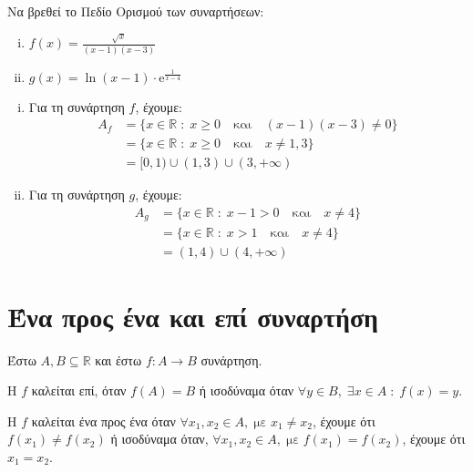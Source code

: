 \begin{exercise}
  Να βρεθεί το Πεδίο Ορισμού των συναρτήσεων:
  \begin{enumerate}[i)]
    \item $ f(x) = \frac{\sqrt{x}}{(x-1)(x-3)} $
    \item $ g(x) = \ln{(x-1)} \cdot \mathrm{e}^{\frac{1}{x-4}} $
  \end{enumerate}
\end{exercise}
\begin{solution}
\item {}
  \begin{enumerate}[i)]
    \item Για τη συνάρτηση $f$, έχουμε:
      \begin{align*}
        A_{f} &= \{ x \in \mathbb{R} \; : \; x \geq 0 \quad \text{και} \quad (x-1)(x-3)
        \neq 0 \} \\ 
              &= \{ x \in \mathbb{R} \; : \; x \geq 0 \quad
              \text{και} \quad x \neq 1,3 \} \\ 
              &= [0,1) \cup (1,3) \cup (3, + \infty) 
        \end{align*} 
      \item Για τη συνάρτηση $g$, έχουμε:
        \begin{align*}
          A_{g} &= \{ x \in \mathbb{R} \; : \; x-1 > 0 \quad \text{και} \quad x \neq 4 \}
          \\
                &= \{ x \in \mathbb{R} \; : \; x > 1 \quad \text{και} \quad x \neq 4 \} 
             \\ 
                &= (1,4) \cup (4, + \infty)
        \end{align*} 
    \end{enumerate}
\end{solution}

\section{Ένα προς ένα και επί συναρτήση}

\begin{dfn}
  Έστω $ A, B \subseteq \mathbb{R} $ και έστω $ f \colon A \to B $ συνάρτηση. 
  \begin{myitemize}
    \item Η $f$ καλείται \textcolor{Col1}{επί}, όταν $ f(A) = B $ ή ισοδύναμα όταν 
      $ \forall y \in B, \; \exists x \in A \; : \; f(x)=y $. 
    \item Η $f$ καλείται \textcolor{Col1}{ένα προς ένα} όταν 
      $ \forall x_{1}, x_{2} \in A, \; \text{με} \; x_{1} \neq x_{2} $, έχουμε ότι 
      $ f(x_{1}) \neq f(x_{2}) $ ή ισοδύναμα όταν, 
      $ \forall x_{1}, x_{2} \in A, \; \text{με} \; f(x_{1}) = f(x_{2}) $, έχουμε ότι 
      $ x_{1}= x_{2} $.
  \end{myitemize}
\end{dfn}

